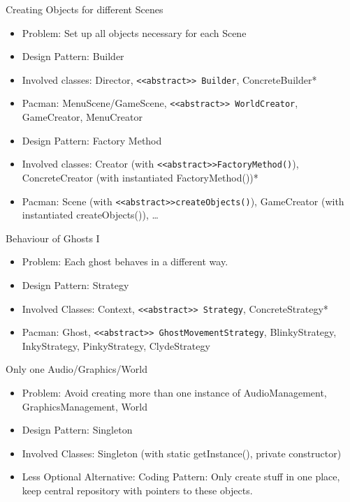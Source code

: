 \documentclass[10pt,t,a4paper]{beamer}
\begin{document}
\begin{frame}[fragile,label=sec-1-7]{Creating Objects for different Scenes}
 \begin{itemize}
\item Problem: Set up all objects necessary for each Scene
\item Design Pattern: Builder
\item Involved classes: Director, \texttt{<<abstract>> Builder}, ConcreteBuilder*
\item Pacman: MenuScene/GameScene, \texttt{<<abstract>> WorldCreator}, GameCreator, MenuCreator
\end{itemize}
\vspace{1cm}
\begin{itemize}
\item Design Pattern: Factory Method
\item Involved classes: Creator (with \texttt{<<abstract>>FactoryMethod()}), ConcreteCreator (with instantiated FactoryMethod())*
\item Pacman: Scene (with \texttt{<<abstract>>createObjects()}), GameCreator (with instantiated createObjects()), \ldots
\end{itemize}
\end{frame}
\begin{frame}[fragile,label=sec-1-8]{Behaviour of Ghosts I}
 \begin{itemize}
\item Problem: Each ghost behaves in a different way.
\item Design Pattern: Strategy
\item Involved Classes: Context, \texttt{<<abstract>> Strategy}, ConcreteStrategy*
\item Pacman: Ghost, \texttt{<<abstract>> GhostMovementStrategy}, BlinkyStrategy, InkyStrategy, PinkyStrategy, ClydeStrategy
\end{itemize}
\end{frame}
\begin{frame}[label=sec-1-9]{Only one Audio/Graphics/World}
\begin{itemize}
\item Problem: Avoid creating more than one instance of AudioManagement, GraphicsManagement, World
\item Design Pattern: Singleton
\item Involved Classes: Singleton (with static getInstance(), private constructor)
\item \alert{Less Optional Alternative:} Coding Pattern: Only create stuff in one place, keep central repository with pointers to these objects.
\end{itemize}
\end{frame}
\end{document}
